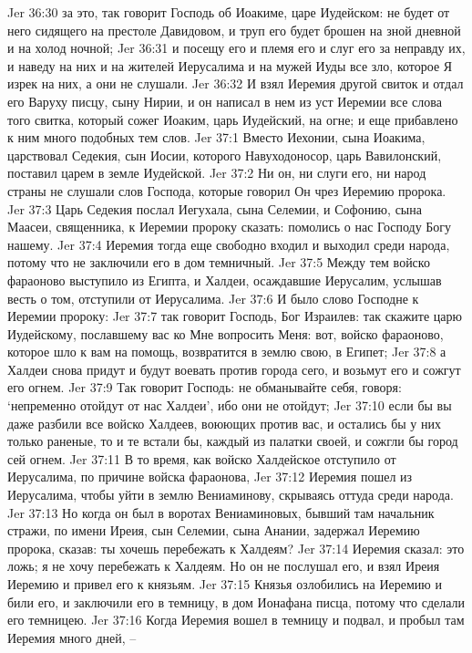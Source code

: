 Jer 36:30  за это, так говорит Господь об Иоакиме, царе Иудейском: не будет от него сидящего на престоле Давидовом, и труп его будет брошен на зной дневной и на холод ночной;
Jer 36:31  и посещу его и племя его и слуг его за неправду их, и наведу на них и на жителей Иерусалима и на мужей Иуды все зло, которое Я изрек на них, а они не слушали.
Jer 36:32  И взял Иеремия другой свиток и отдал его Варуху писцу, сыну Нирии, и он написал в нем из уст Иеремии все слова того свитка, который сожег Иоаким, царь Иудейский, на огне; и еще прибавлено к ним много подобных тем слов.
Jer 37:1  Вместо Иехонии, сына Иоакима, царствовал Седекия, сын Иосии, которого Навуходоносор, царь Вавилонский, поставил царем в земле Иудейской.
Jer 37:2  Ни он, ни слуги его, ни народ страны не слушали слов Господа, которые говорил Он чрез Иеремию пророка.
Jer 37:3  Царь Седекия послал Иегухала, сына Селемии, и Софонию, сына Маасеи, священника, к Иеремии пророку сказать: помолись о нас Господу Богу нашему.
Jer 37:4  Иеремия тогда еще свободно входил и выходил среди народа, потому что не заключили его в дом темничный.
Jer 37:5  Между тем войско фараоново выступило из Египта, и Халдеи, осаждавшие Иерусалим, услышав весть о том, отступили от Иерусалима.
Jer 37:6  И было слово Господне к Иеремии пророку:
Jer 37:7  так говорит Господь, Бог Израилев: так скажите царю Иудейскому, пославшему вас ко Мне вопросить Меня: вот, войско фараоново, которое шло к вам на помощь, возвратится в землю свою, в Египет;
Jer 37:8  а Халдеи снова придут и будут воевать против города сего, и возьмут его и сожгут его огнем.
Jer 37:9  Так говорит Господь: не обманывайте себя, говоря: `непременно отойдут от нас Халдеи', ибо они не отойдут;
Jer 37:10  если бы вы даже разбили все войско Халдеев, воюющих против вас, и остались бы у них только раненые, то и те встали бы, каждый из палатки своей, и сожгли бы город сей огнем.
Jer 37:11  В то время, как войско Халдейское отступило от Иерусалима, по причине войска фараонова,
Jer 37:12  Иеремия пошел из Иерусалима, чтобы уйти в землю Вениаминову, скрываясь оттуда среди народа.
Jer 37:13  Но когда он был в воротах Вениаминовых, бывший там начальник стражи, по имени Иреия, сын Селемии, сына Анании, задержал Иеремию пророка, сказав: ты хочешь перебежать к Халдеям?
Jer 37:14  Иеремия сказал: это ложь; я не хочу перебежать к Халдеям. Но он не послушал его, и взял Иреия Иеремию и привел его к князьям.
Jer 37:15  Князья озлобились на Иеремию и били его, и заключили его в темницу, в дом Ионафана писца, потому что сделали его темницею.
Jer 37:16  Когда Иеремия вошел в темницу и подвал, и пробыл там Иеремия много дней, --
